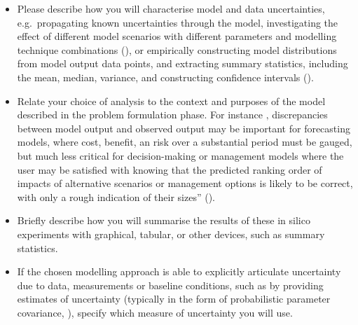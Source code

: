\documentclass[
]{article}
\providecommand{\tightlist}{%
  \setlength{\itemsep}{0pt}\setlength{\parskip}{0pt}}
\begin{document}
\begin{tcolorbox}[enhanced jigsaw, opacitybacktitle=0.6, bottomrule=.15mm, leftrule=.75mm, rightrule=.15mm, colbacktitle=quarto-callout-caution-color!10!white, toprule=.15mm, titlerule=0mm, left=2mm, colframe=quarto-callout-caution-color-frame, breakable, title=\textcolor{quarto-callout-caution-color}{\faFire}\hspace{0.5em}{Preregistration Item}, opacityback=0, coltitle=black, bottomtitle=1mm, colback=white, toptitle=1mm, arc=.35mm]

\begin{itemize}
\tightlist
\item[$\square$]
  Please describe how you will characterise model and data
  uncertainties, e.g.~propagating known uncertainties through the model,
  investigating the effect of different model scenarios with different
  parameters and modelling technique combinations
  (), or empirically
  constructing model distributions from model output data points, and
  extracting summary statistics, including the mean, median, variance,
  and constructing confidence intervals
  ().
\item[$\square$]
  Relate your choice of analysis to the context and purposes of the
  model described in the problem formulation phase. For instance ‚
  discrepancies between model output and observed output may be
  important for forecasting models, where cost, benefit, an risk over a
  substantial period must be gauged, but much less critical for
  decision-making or management models where the user may be satisfied
  with knowing that the predicted ranking order of impacts of
  alternative scenarios or management options is likely to be correct,
  with only a rough indication of their sizes''
  ().
\item[$\square$]
  Briefly describe how you will summarise the results of these in silico
  experiments with graphical, tabular, or other devices, such as summary
  statistics.
\item[$\square$]
  If the chosen modelling approach is able to explicitly articulate
  uncertainty due to data, measurements or baseline conditions, such as
  by providing estimates of uncertainty (typically in the form of
  probabilistic parameter covariance,
  ), specify which
  measure of uncertainty you will use.
\end{itemize}

\end{tcolorbox}
\end{document}
